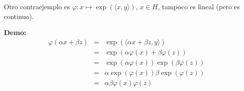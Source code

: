 Otro contraejemplo es $\varphi: x\mapsto\exp(\langle x,y\rangle)$, $x\in H$, tampoco
es lineal (pero es continuo).

\textbf{Demo:} 
\begin{eqnarray*}
\varphi(\alpha x + \beta z) &=& \exp(\langle \alpha x + \beta z, y \rangle)\\
&=& \exp(\alpha \varphi(x) +  \beta \varphi(z)) \\
&=& \exp(\alpha \varphi(x))\exp(\beta \varphi(z)) \\
&=& \alpha\exp(\varphi(x))\beta\exp(\varphi(z)) \\
&=& \alpha \beta \varphi(x) \varphi(z) 
\end{eqnarray*}
